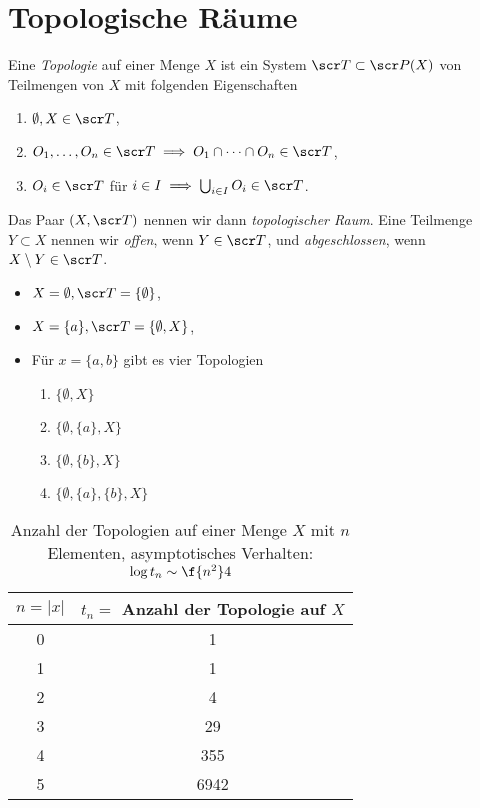
\chapter{Topologische Räume}


\begin{df}
	Eine \emph{Topologie} auf einer Menge $X$ ist ein System $\scr T \subset \scr P(X)$ von Teilmengen von $X$ mit folgenden Eigenschaften
	\begin{enumerate}[O1)]
		\item
			$\emptyset, X \in \scr T$,
		\item
			$O_1, \dotsc, O_n \in \scr T \implies O_1 \cap \dotsb \cap O_n \in \scr T$,
		\item
			$O_i \in \scr T$ für $i \in I \implies \bigcup_{i\in I} O_i \in \scr T$.
	\end{enumerate}
	Das Paar $(X, \scr T)$ nennen wir dann \emph{topologischer Raum}.
	Eine Teilmenge $Y \subset X$ nennen wir \emph{offen}, wenn $Y \in \scr T$, und \emph{abgeschlossen}, wenn $X \setminus Y \in \scr T$.
\end{df}

\begin{ex}
	\begin{itemize}
		\item
			$X = \emptyset, \scr T = \{\emptyset\}$,
		\item
			$X = \{a\}, \scr T = \{ \emptyset, X \}$,
		\item
			Für $x = \{a,b\}$ gibt es vier Topologien
			\begin{enumerate}[1.]
				\item
					$\{\emptyset, X\}$
				\item
					$\{\emptyset, \{a\}, X\}$
				\item
					$\{\emptyset, \{b\}, X \}$
				\item
					$\{\emptyset, \{a\}, \{b\}, X\}$
			\end{enumerate}
	\end{itemize}
	\begin{table}
		\centering
		\caption{Anzahl der Topologien auf einer Menge $X$ mit $n$ Elementen, asymptotisches Verhalten: $\log t_n \sim \f {n^2}4$}
		\begin{tabular}{c|c}
			$n=|x|$ & $t_n = $ Anzahl der Topologie auf $X$ \\ \hline
			0 & 1 \\
			1 & 1 \\
			2 & 4 \\
			3 & 29 \\
			4 & 355 \\
			5 & 6942
		\end{tabular}
	\end{table}
\end{ex}

